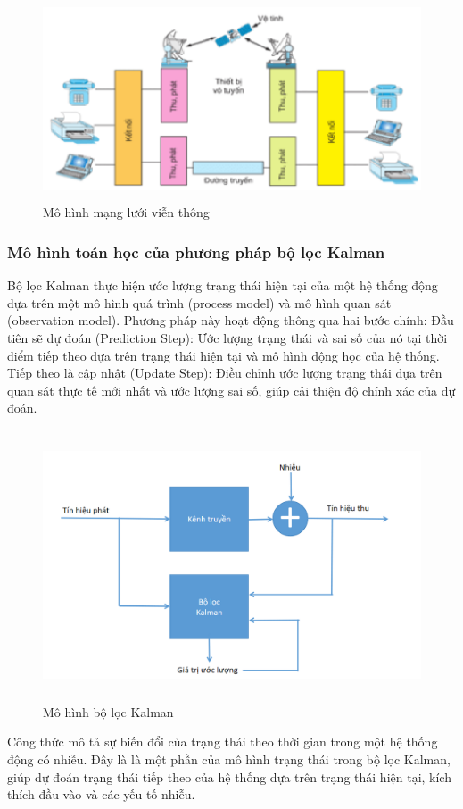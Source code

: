 \documentclass{article}
\begin{document}
\begin{figure}[h]
    \centering
   \includegraphics[width=12cm, height =6cm]{photo/2.3.1.png}
    \caption{Mô hình mạng lưới viễn thông}
    \label{Hình 3}
\end{figure}


\subsubsection{Mô hình toán học của phương pháp bộ lọc Kalman}
Bộ lọc Kalman thực hiện ước lượng trạng thái hiện tại của một hệ thống động dựa trên một mô hình quá trình (process model) và mô hình quan sát (observation model). Phương pháp này hoạt động thông qua hai bước chính:
Đầu tiên sẽ dự đoán (Prediction Step): Ước lượng trạng thái và sai số của nó tại thời điểm tiếp theo dựa trên trạng thái hiện tại và mô hình động học của hệ thống. Tiếp theo là cập nhật (Update Step): Điều chỉnh ước lượng trạng thái dựa trên quan sát thực tế mới nhất và ước lượng sai số, giúp cải thiện độ chính xác của dự đoán.\\

\begin{figure}[h!]
    \centering
    \includegraphics[width=13cm, height =8cm]{photo/2.3.2.png}
    \caption{Mô hình bộ lọc Kalman}
    \label{Hình 4}
\end{figure}
\newpage
Công thức mô tả sự biến đổi của trạng thái theo thời gian trong một hệ thống động có nhiễu. Đây là là một phần của mô hình trạng thái trong bộ lọc Kalman, giúp dự đoán trạng thái tiếp theo của hệ thống dựa trên trạng thái hiện tại, kích thích đầu vào và các yếu tố nhiễu.\\
\end{document}
